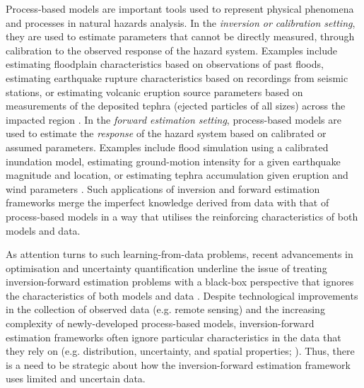 Process-based models are important tools used to represent physical phenomena and processes in natural hazards analysis. In the \textit{inversion or calibration setting}, they are used to estimate parameters that cannot be directly measured, through calibration to the observed response of the hazard system. Examples include estimating floodplain characteristics based on observations of past floods, estimating earthquake rupture characteristics based on recordings from seismic stations, or estimating volcanic eruption source parameters based on measurements of the deposited tephra (ejected particles of all sizes) across the impacted region \citep{li2022comparative, georgoudas2007cellular, connor2006inversion}. In the \textit{forward estimation setting}, process-based models are used to estimate the \textit{response} of the hazard system based on calibrated or assumed parameters. Examples include flood simulation using a calibrated inundation model, estimating ground-motion intensity for a given earthquake magnitude and location, or estimating tephra accumulation given eruption and wind parameters \citep{uhlenbrook2004hydrological, worden2010revised, wang2022ground, hurst1999performance, folch2009fall3d}. Such applications of inversion and forward estimation frameworks merge the imperfect knowledge derived from data with that of process-based models in a way that utilises the reinforcing characteristics of both models and data.

As attention turns to such learning-from-data problems, recent advancements in optimisation and uncertainty quantification underline the issue of treating inversion-forward estimation problems with a black-box perspective that ignores the characteristics of both models and data \citep{hollos2022conditional, cabaneros2022methods, biegler2011large, ISAAC2015348, oden2010computer}. Despite technological improvements in the collection of observed data (e.g. remote sensing) and the increasing complexity of newly-developed process-based models, inversion-forward estimation frameworks often ignore particular characteristics in the data that they rely on (e.g. distribution, uncertainty, and spatial properties; \cite{willcox2021imperative}). Thus, there is a need to be strategic about how the inversion-forward estimation framework uses limited and uncertain data.

